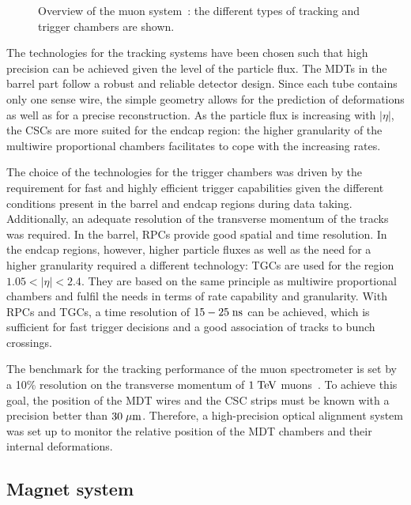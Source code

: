 \begin{figure}[h]
\begin{center}
\caption[Overview of the muon system]{
  Overview of the muon system~\cite{detectorpaper}:
  the different types of tracking and trigger chambers are shown.}
\label{fig:muons}
\end{center}
\end{figure}

The technologies for the tracking systems have been chosen such that high precision can be achieved given the level of the particle flux.
The MDTs in the barrel part follow a robust and reliable detector design.
Since each tube contains only one sense wire, the simple geometry allows for the prediction of deformations as well as for a precise reconstruction.
As the particle flux is increasing with $|\eta|$, the CSCs are more suited for the endcap region:
the higher granularity of the multiwire proportional chambers facilitates to cope with the increasing rates.

The choice of the technologies for the trigger chambers was driven by the requirement for fast and highly efficient trigger capabilities
given the different conditions present in the barrel and endcap regions during data taking.
Additionally, an adequate resolution of the transverse momentum of the tracks was required.
In the barrel, RPCs provide good spatial and time resolution.
In the endcap regions, however, higher particle fluxes as well as the need for a higher granularity required a different
technology: TGCs are used for the region \mbox{$1.05 < |\eta| < 2.4$}.
They are based on the same principle as multiwire proportional chambers and fulfil the needs in terms of rate capability and granularity.
With RPCs and TGCs, a time resolution of \mbox{$15 - 25 \; \mathrm{ns}$} can be achieved, which is sufficient for fast trigger decisions and a good association of
tracks to bunch crossings.

The benchmark for the tracking performance of the muon spectrometer is set by a 10\% resolution on the transverse momentum of \mbox{$1 \; \mathrm{TeV}$}
muons~\cite{detectorpaper}.
To achieve this goal, the position of the MDT wires and the CSC strips must be known with a precision better than \mbox{$30 \; \mu\mathrm{m}$}.
Therefore, a high-precision optical alignment system was set up to monitor the relative position of the MDT chambers and their internal deformations.

\subsection{Magnet system}
\label{sec:magnets}

